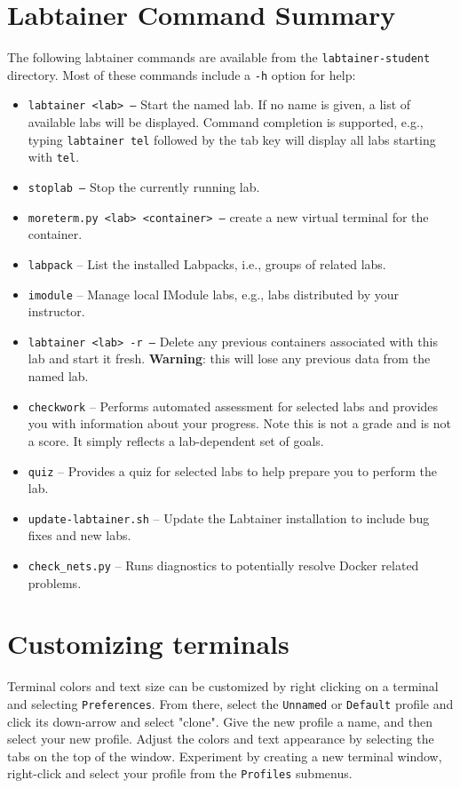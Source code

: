 \documentclass[12pt]{article}
\begin{document}
\pagebreak
\begin{appendices}
{}
\setcounter{page}{3}
\section{Labtainer Command Summary}
\label{sec:appendixA}
The following labtainer commands are available from the \texttt{labtainer-student}
directory.  Most of these commands include a {\tt -h} option for help:
\begin{itemize}
\item \texttt{labtainer <lab> --}
Start the named lab.  If no name is given, a list of available labs will be displayed. Command completion is
supported, e.g., typing {\tt labtainer tel} followed by the tab key will display all labs starting with {\tt tel}.
\item \texttt{stoplab  --} Stop the currently running lab.
\item \texttt{moreterm.py <lab> <container> --} create a new virtual terminal for the container.
\item \texttt{labpack} -- List the installed Labpacks, i.e., groups of related labs.
\item \texttt{imodule} -- Manage local IModule labs, e.g., labs distributed by your instructor.
\item \texttt{labtainer <lab> -r --}
Delete any previous containers associated with this lab and start it fresh.  \textbf{Warning}: this will lose any
previous data from the named lab.
\item \texttt{checkwork} -- Performs automated assessment for selected labs and provides you with information about your progress.
Note this is not a grade and is not a score.  It simply reflects a lab-dependent set of goals.
\item \texttt{quiz} -- Provides a quiz for selected labs to help prepare you to perform the lab.
\item \texttt{update-labtainer.sh} -- Update the Labtainer installation to include bug fixes and new labs.
\item \texttt{check\_nets.py} -- Runs diagnostics to potentially resolve Docker related problems.

\end{itemize}

\section{Customizing terminals}
\label{sec:appendixB}
Terminal colors and text size can be customized by right clicking on a terminal and selecting {\tt Preferences}.  From there, select
the {\tt Unnamed} or {\tt Default} profile and click its down-arrow and select "clone".  Give the new profile a name, and then
select your new profile.  Adjust the colors and text appearance by selecting the tabs on the top of the window.  Experiment
by creating a new terminal window, right-click and select your profile from the {\tt Profiles} submenus.


\end{appendices}
\end{document}
